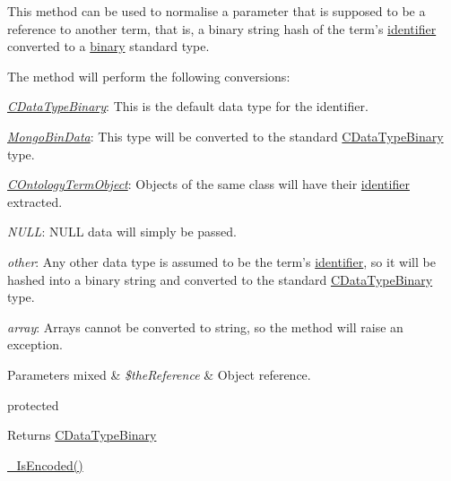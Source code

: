 This method can be used to normalise a parameter that is supposed to be a reference to another term, that is, a binary string hash of the term's \hyperlink{class_c_ontology_term_object_aab0069df9aae1a8480ea0cdd933a58f1}{identifier} converted to a \hyperlink{class_c_data_type_binary}{binary} standard type.

The method will perform the following conversions\-:


\begin{DoxyItemize}
\item {\itshape \hyperlink{class_c_data_type_binary}{C\-Data\-Type\-Binary}}\-: This is the default data type for the identifier. 
\item {\itshape \hyperlink{}{Mongo\-Bin\-Data}}\-: This type will be converted to the standard \hyperlink{class_c_data_type_binary}{C\-Data\-Type\-Binary} type. 
\item {\itshape \hyperlink{class_c_ontology_term_object}{C\-Ontology\-Term\-Object}}\-: Objects of the same class will have their \hyperlink{class_c_persistent_unit_object_ad1ca0920cf0df3c24351402f9afbf34b}{identifier} extracted. 
\item {\itshape N\-U\-L\-L}\-: N\-U\-L\-L data will simply be passed. 
\item {\itshape other}\-: Any other data type is assumed to be the term's \hyperlink{class_c_ontology_term_object_aab0069df9aae1a8480ea0cdd933a58f1}{identifier}, so it will be hashed into a binary string and converted to the standard \hyperlink{class_c_data_type_binary}{C\-Data\-Type\-Binary} type. 
\item {\itshape array}\-: Arrays cannot be converted to string, so the method will raise an exception. 
\end{DoxyItemize}


\begin{DoxyParams}[1]{Parameters}
mixed & {\em \$the\-Reference} & Object reference.\\
\hline
\end{DoxyParams}
protected \begin{DoxyReturn}{Returns}
\hyperlink{class_c_data_type_binary}{C\-Data\-Type\-Binary}
\end{DoxyReturn}
\hyperlink{class_c_persistent_object_aa8dc7db66e2af3d28c2035161a2aabf9}{\-\_\-\-Is\-Encoded()}

